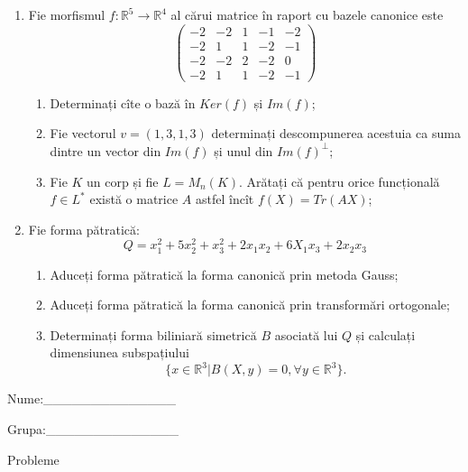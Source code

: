 \documentclass{article}
\begin{document}
\begin{enumerate}
 \item Fie morfismul $f:\mathbb{R}^5 \to \mathbb{R}^4$ al cărui matrice în raport cu bazele canonice este
$$\begin{pmatrix}
-2&-2&1&-1&-2\\
-2&1&1&-2&-1\\
-2&-2&2&-2&0\\
-2&1&1&-2&-1
\end{pmatrix}$$

\begin{enumerate}
\item Determinați cîte o bază în $Ker(f)$ și $Im(f)$;
\item Fie vectorul $v=(1,3,1,3)$ determinați descompunerea acestuia ca suma dintre un vector din $Im(f)$ și unul din $Im(f)^\perp$;
\item Fie $K$ un corp și fie $L=M_n(K)$. Arătați că pentru orice funcțională $f \in L^*$ există o matrice $A$ astfel încît $f(X)=Tr(AX)$;
\end{enumerate}
\item Fie forma pătratică:
$$Q= x_1^2+5x_2^2+x_3^2+2x_1x_2+6X_1x_3+2x_2x_3$$

\begin{enumerate}
\item Aduceți forma pătratică la forma canonică prin metoda Gauss;
\item Aduceți forma pătratică la forma canonică prin transformări ortogonale;
\item Determinați forma biliniară simetrică $B$ asociată lui $Q$ și calculați dimensiunea subspațiului
$$\{x \in \mathbb{R}^3 | B(X,y)=0,\forall y \in \mathbb{R}^3\}.$$

\end{enumerate}
\end{enumerate}
\newpage
\begin{flushright}
Nume:\_\_\_\_\_\_\_\_\_\_\_\_\_\_
 
 
Grupa:\_\_\_\_\_\_\_\_\_\_\_\_\_\_
\end{flushright}
\begin{center}
\vspace{2cm}
{\Large Probleme}
\vspace{2cm}
\end{center}
\end{document}
